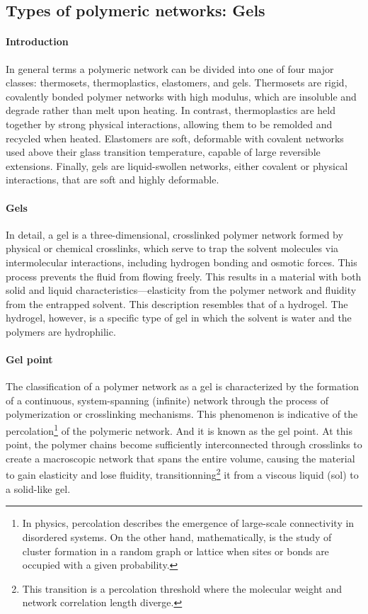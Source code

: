 \subsection{Types of polymeric networks: Gels}

\paragraph{Introduction} In general terms a polymeric network can be divided into one of four major classes: 
    thermosets,
    thermoplastics,
    elastomers,
    and gels.
Thermosets are rigid, covalently bonded polymer networks with high modulus, which are insoluble and degrade rather than melt upon heating. 
In contrast, thermoplastics are held together by strong physical interactions, allowing them to be remolded and recycled when heated. 
Elastomers are soft, deformable with covalent networks used above their glass transition temperature, capable of large reversible extensions. 
Finally, gels are liquid-swollen networks, either covalent or physical interactions, that are soft and highly deformable.

\paragraph{Gels} In detail, a gel is a three-dimensional, crosslinked polymer network formed by physical or chemical crosslinks, which serve to trap the solvent molecules via intermolecular interactions, including hydrogen bonding and osmotic forces. This process prevents the fluid from flowing freely.
This results in a material with both solid and liquid characteristics—elasticity from the polymer network and fluidity from the entrapped solvent.
This description resembles that of a hydrogel.
The hydrogel, however, is a specific type of gel in which the solvent is water and the polymers are hydrophilic.

\paragraph{Gel point} The classification of a polymer network as a gel is characterized by the formation of a continuous, system-spanning (infinite) network through the process of polymerization or crosslinking mechanisms.
This phenomenon is indicative of the percolation\footnote{In physics, percolation describes the emergence of large-scale connectivity in disordered systems. On the other hand, mathematically, is the study of cluster formation in a random graph or lattice when sites or bonds are occupied with a given probability.} of the polymeric network.
And it is known as the gel point.
At this point, the polymer chains become sufficiently interconnected through crosslinks to create a macroscopic network that spans the entire volume, causing the material to gain elasticity and lose fluidity, transitionning\footnote{This transition is a percolation threshold where the molecular weight and network correlation length diverge.} it from a viscous liquid (sol) to a solid-like gel.

